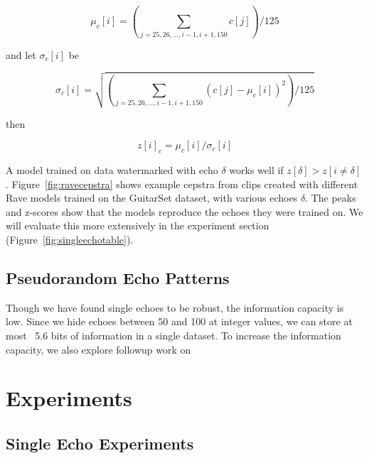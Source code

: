 \documentclass[letterpaper]{article} %
\begin{document}
\begin{equation}
    \mu_{c}[i] = \left( \sum_{j=25, 26, ..., i-1, i+1, 150} c[j] \right) / 125
\end{equation}

and let $\sigma_{c}[i]$ be 

\begin{equation}
    \sigma_{c}[i] = \sqrt{ \left( \sum_{j=25, 26, ..., i-1, i+1, 150} (c[j] - \mu_c[i])^2 \right) / 125}
\end{equation}

then

\begin{equation}
z[i]_{c} = \mu_{c}[i] / \sigma_{c}[i]
\end{equation}


A model trained on data watermarked with echo $\delta$ works well if $z[\delta] > z[i \neq \delta]$.  Figure~\ref{fig:ravecepstra} shows example cepstra from clips created with different Rave\cite{caillon2021rave} models trained on the GuitarSet \cite{xi2018guitarset} dataset, with various echoes $\delta$.  The peaks and z-scores show that the models reproduce the echoes they were trained on.  We will evaluate this more extensively in the experiment section (Figure~\ref{fig:singleechotable}).

\subsection{Pseudorandom Echo Patterns}

Though we have found single echoes to be robust, the information capacity is low.  Since we hide echoes between 50 and 100 at integer values, we can store at most ~5.6 bits of information in a single dataset.  To increase the information capacity, we also explore followup work on 





\section{Experiments}

\subsection{Single Echo Experiments}
\label{sec:experimentssingleecho}
\end{document}
